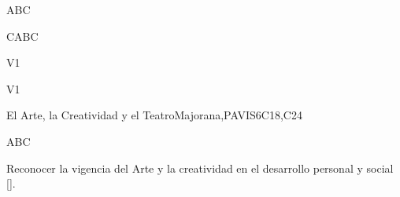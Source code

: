 \begin{syllabus}


\begin{justification}
ABC
\end{justification}

\begin{goals}
\item CABC
\end{goals}

\begin{outcomes}{V1}
    \item {}
    \item {}
\end{outcomes}

\begin{competences}{V1}
    \item {}
    \item {}
    \item {}
\end{competences}

\begin{unit}{}{El Arte, la Creatividad y el Teatro}{Majorana,PAVIS}{6}{C18,C24}
\begin{topics}
	\item ABC
\end{topics}
\begin{learningoutcomes}
	\item Reconocer la vigencia del Arte y la creatividad en el desarrollo personal y social [\Usage].
	
\end{learningoutcomes}
\end{unit}


\begin{coursebibliography}
\end{coursebibliography}

\end{syllabus}
